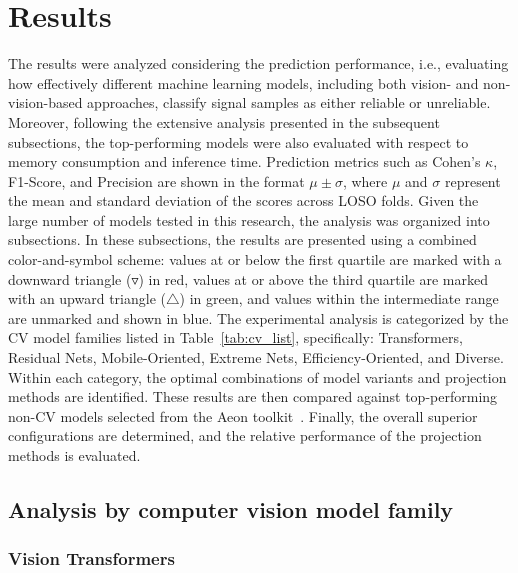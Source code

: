 \documentclass[final,3p,times,twocolumn]{elsarticle}
\begin{document}
\section{Results} \label{sec:results}

The results were analyzed considering the prediction performance, i.e., evaluating how effectively different machine learning models, including both vision- and non-vision-based approaches, classify signal samples as either reliable or unreliable. Moreover, following the extensive analysis presented in the subsequent subsections, the top-performing models were also evaluated with respect to memory consumption and inference time.
Prediction metrics such as Cohen's $\kappa$, F1-Score, and Precision are shown in the format $\mu \pm \sigma$, where $\mu$ and $\sigma$ represent the mean and standard deviation of the scores across \gls{LOSO} folds.
Given the large number of models tested in this research, the analysis was organized into subsections.
In these subsections, the results are presented using a combined color-and-symbol scheme: values at or below the first quartile are marked with a downward triangle ($\triangledown$) in red, values at or above the third quartile are marked with an upward triangle ($\triangle$) in green, and values within the intermediate range are unmarked and shown in blue. 
The experimental analysis is categorized by the \gls{CV} model families listed in Table~\ref{tab:cv_list}, specifically: Transformers, Residual Nets, Mobile-Oriented, Extreme Nets, Efficiency-Oriented, and Diverse. Within each category, the optimal combinations of model variants and projection methods are identified. These results are then compared against top-performing non-\gls{CV} models selected from the Aeon toolkit~\cite{aeon2024}. Finally, the overall superior configurations are determined, and the relative performance of the projection methods is evaluated.


\subsection{Analysis by computer vision model family}
 
 
\subsubsection{Vision Transformers}
\end{document}
